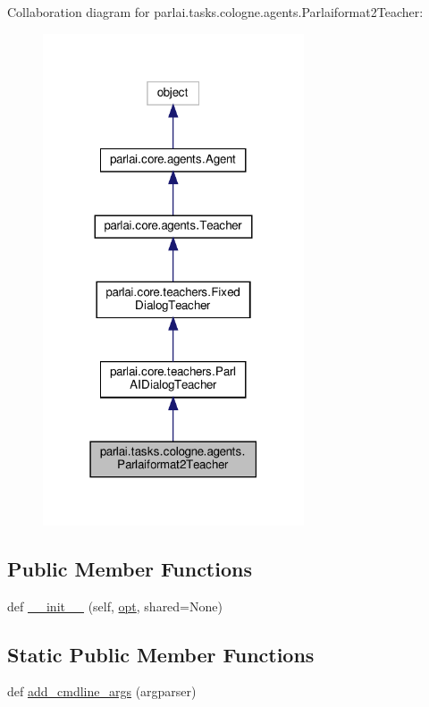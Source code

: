 Collaboration diagram for parlai.\+tasks.\+cologne.\+agents.\+Parlaiformat2\+Teacher\+:
\nopagebreak
\begin{figure}[H]
\begin{center}
\leavevmode
\includegraphics[width=219pt]{d1/d94/classparlai_1_1tasks_1_1cologne_1_1agents_1_1Parlaiformat2Teacher__coll__graph}
\end{center}
\end{figure}
\subsection*{Public Member Functions}
\begin{DoxyCompactItemize}
\item 
def \hyperlink{classparlai_1_1tasks_1_1cologne_1_1agents_1_1Parlaiformat2Teacher_a6e9079898209456df94741e7780aa0c7}{\+\_\+\+\_\+init\+\_\+\+\_\+} (self, \hyperlink{classparlai_1_1core_1_1agents_1_1Teacher_a3ce6243860ce978a897922863ed32fa4}{opt}, shared=None)
\end{DoxyCompactItemize}
\subsection*{Static Public Member Functions}
\begin{DoxyCompactItemize}
\item 
def \hyperlink{classparlai_1_1tasks_1_1cologne_1_1agents_1_1Parlaiformat2Teacher_a71d2157bd6c642aeb4f26f04c33941ed}{add\+\_\+cmdline\+\_\+args} (argparser)
\end{DoxyCompactItemize}
